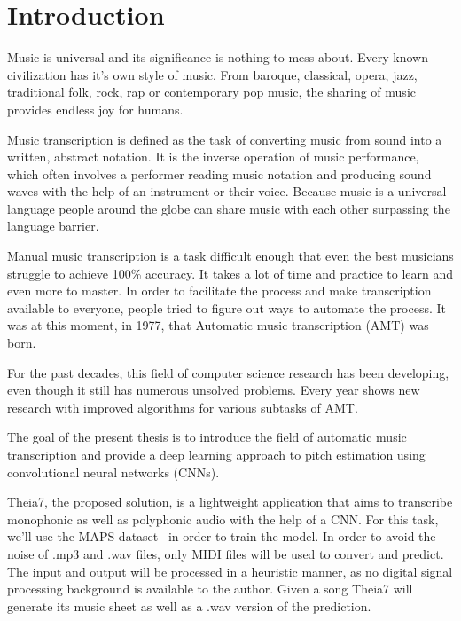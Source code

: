 \newpage
\chapter{Introduction}
Music is universal and its significance is nothing to mess about. Every known civilization has it's own style of music. From baroque, classical, opera, jazz, traditional folk, rock, rap or contemporary pop music, the sharing of music provides endless joy for humans.
\par
Music transcription is defined as the task of converting music from sound into a written, abstract notation.
It is the inverse operation of music performance, which often involves a performer reading music notation and producing sound waves with the help of an instrument or their voice. Because music is a universal language people around the globe can share music with each other surpassing the language barrier.
\par
Manual music transcription is a task difficult enough that even the best musicians struggle to achieve 100\% accuracy. It takes a lot of time and practice to learn and even more to master. In order to facilitate the process and make transcription available to everyone, people tried to figure out ways to automate the process. It was at this moment, in 1977, that Automatic music transcription (AMT) was born.
\par
For the past decades, this field of computer science research has been developing, even though it still  has numerous unsolved problems. Every year shows new research with improved algorithms for various subtasks of AMT.
\par
The goal of the present thesis is to introduce the field of automatic music transcription and provide a deep learning approach to pitch estimation using convolutional neural networks (CNNs).

\par
Theia7, the proposed solution, is a lightweight application that aims to transcribe monophonic as well as polyphonic audio with the help of a CNN. For this task, we'll use the MAPS dataset~\cite{maps} in order to train the model. In order to avoid the noise of .mp3 and .wav files, only MIDI files will be used to convert and predict. The input and output will be processed in a heuristic manner, as no digital signal processing background is available to the author. Given a song Theia7 will generate its music sheet as well as a .wav version of the prediction. 
